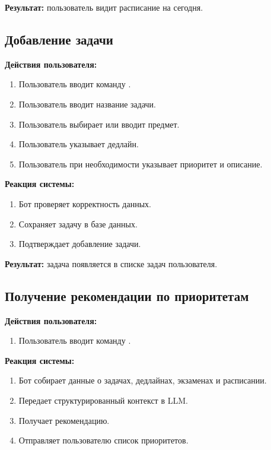 \documentclass[10pt,a4paper,final]{article} %
\begin{document}
\textbf{Результат:} пользователь видит расписание на сегодня.

\subsection{Добавление задачи}

\textbf{Действия пользователя:}

\begin{enumerate}
    \item Пользователь вводит команду .
    \item Пользователь вводит название задачи.
    \item Пользователь выбирает или вводит предмет.
    \item Пользователь указывает дедлайн.
    \item Пользователь при необходимости указывает приоритет и описание.
\end{enumerate}

\textbf{Реакция системы:}

\begin{enumerate}
    \item Бот проверяет корректность данных.
    \item Сохраняет задачу в базе данных.
    \item Подтверждает добавление задачи.
\end{enumerate}

\textbf{Результат:} задача появляется в списке задач пользователя.

\subsection{Получение рекомендации по приоритетам}

\textbf{Действия пользователя:}

\begin{enumerate}
    \item Пользователь вводит команду .
\end{enumerate}

\textbf{Реакция системы:}

\begin{enumerate}
    \item Бот собирает данные о задачах, дедлайнах, экзаменах и расписании.
    \item Передает структурированный контекст в LLM.
    \item Получает рекомендацию.
    \item Отправляет пользователю список приоритетов.
\end{enumerate}
\end{document}
